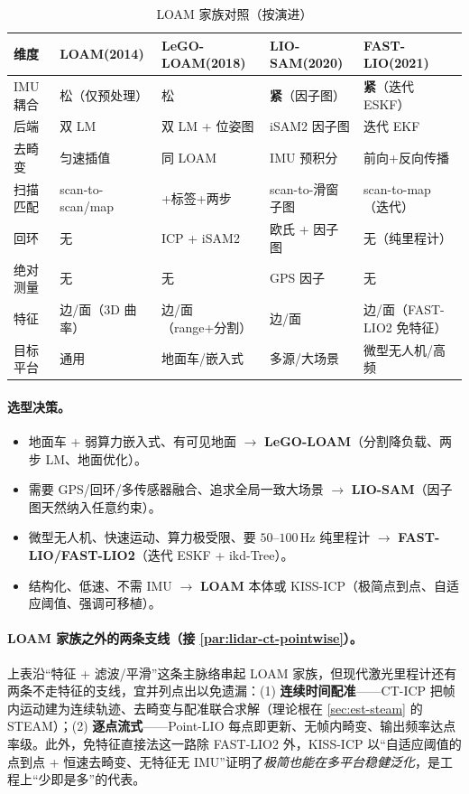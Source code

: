 \begin{table}[H]\centering\small
\caption{LOAM 家族对照（按演进）}
\label{tab:lidar-family}
\begin{tabular}{lllll}
\toprule
维度 & LOAM(2014) & LeGO-LOAM(2018) & LIO-SAM(2020) & FAST-LIO(2021) \\
\midrule
IMU 耦合 & 松（仅预处理） & 松 & \textbf{紧}（因子图） & \textbf{紧}（迭代 ESKF） \\
后端 & 双 LM & 双 LM + 位姿图 & iSAM2 因子图 & 迭代 EKF \\
去畸变 & 匀速插值 & 同 LOAM & IMU 预积分 & 前向+反向传播 \\
扫描匹配 & scan-to-scan/map & +标签+两步 & scan-to-滑窗子图 & scan-to-map（迭代） \\
回环 & 无 & ICP + iSAM2 & 欧氏 + 因子图 & 无（纯里程计） \\
绝对测量 & 无 & 无 & GPS 因子 & 无 \\
特征 & 边/面（3D 曲率） & 边/面（range+分割） & 边/面 & 边/面（FAST-LIO2 免特征） \\
目标平台 & 通用 & 地面车/嵌入式 & 多源/大场景 & 微型无人机/高频 \\
\bottomrule
\end{tabular}
\end{table}

\paragraph{选型决策。}
\begin{itemize}
  \item 地面车 + 弱算力嵌入式、有可见地面 $\to$ \textbf{LeGO-LOAM}（分割降负载、两步 LM、地面优化）。
  \item 需要 GPS/回环/多传感器融合、追求全局一致大场景 $\to$ \textbf{LIO-SAM}（因子图天然纳入任意约束）。
  \item 微型无人机、快速运动、算力极受限、要 $50$–$100$\,Hz 纯里程计 $\to$ \textbf{FAST-LIO/FAST-LIO2}（迭代 ESKF + ikd-Tree）。
  \item 结构化、低速、不需 IMU $\to$ \textbf{LOAM} 本体或 KISS-ICP\cite{vizzo2023kissicp}（极简点到点、自适应阈值、强调可移植）。
\end{itemize}

\paragraph{LOAM 家族之外的两条支线（接 \cref{par:lidar-ct-pointwise}）。}
上表沿“特征 + 滤波/平滑”这条主脉络串起 LOAM 家族，但现代激光里程计还有两条不走特征的支线，宜并列点出以免遗漏：(1) \textbf{连续时间配准}——CT-ICP\cite{dellenbach2022cticp} 把帧内运动建为连续轨迹、去畸变与配准联合求解（理论根在 \cref{sec:est-steam} 的 STEAM）；(2) \textbf{逐点流式}——Point-LIO\cite{he2023pointlio} 每点即更新、无帧内畸变、输出频率达点率级。此外，免特征直接法这一路除 FAST-LIO2 外，KISS-ICP\cite{vizzo2023kissicp} 以“自适应阈值的点到点 + 恒速去畸变、无特征无 IMU”证明了\emph{极简也能在多平台稳健泛化}，是工程上“少即是多”的代表。

